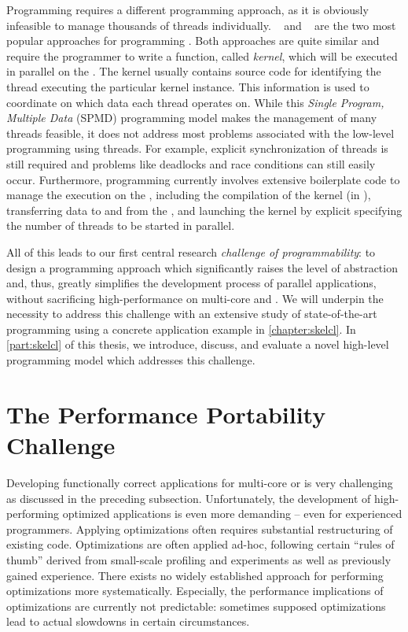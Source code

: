 Programming \GPUs requires a different programming approach, as it is obviously infeasible to manage thousands of threads individually.
\CUDA~\cite{CUDAProgrammingGuide} and \OpenCL~\cite{OpenCL} are the two most popular approaches for programming \GPUs.
Both approaches are quite similar and require the programmer to write a function, called \emph{kernel}, which will be executed in parallel on the \GPU.
The kernel usually contains source code for identifying the thread executing the particular kernel instance.
This information is used to coordinate on which data each thread operates on.
While this \emph{Single Program, Multiple Data} (SPMD) programming model makes the management of many threads feasible, it does not address most problems associated with the low-level programming using threads.
For example, explicit synchronization of threads is still required and problems like deadlocks and race conditions can still easily occur.
Furthermore, \GPU programming currently involves extensive boilerplate code to manage the execution on the \GPU, including the compilation of the kernel (in \OpenCL), transferring data to and from the \GPU, and launching the kernel by explicit specifying the number of threads to be started in parallel.

All of this leads to our first central research \emph{challenge of programmability}:
to design a programming approach which significantly raises the level of abstraction and, thus, greatly simplifies the development process of parallel applications, without sacrificing high-performance on multi-core \CPUs and \GPUs.
We will underpin the necessity to address this challenge with an extensive study of state-of-the-art \GPU programming using a concrete application example in \autoref{chapter:skelcl}.
In \autoref{part:skelcl} of this thesis, we introduce, discuss, and evaluate a novel high-level programming model which addresses this challenge.

\pagebreak
\section{The Performance Portability Challenge}

Developing functionally correct applications for multi-core \CPUs or \GPUs is very challenging as discussed in the preceding subsection.
Unfortunately, the development of high-performing optimized applications is even more demanding -- even for experienced programmers.
Applying optimizations often requires substantial restructuring of existing code.
Optimizations are often applied ad-hoc, following certain ``rules of thumb'' derived from small-scale profiling and experiments as well as previously gained experience.
There exists no widely established approach for performing optimizations more systematically.
Especially, the performance implications of optimizations are currently not predictable:
sometimes supposed optimizations lead to actual slowdowns in certain circumstances.

